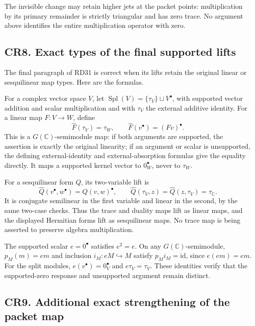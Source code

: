 \documentclass[
]{article}
\begin{document}
The invisible change may retain higher jets at the packet points:
multiplication by its primary remainder is strictly triangular and has
zero trace. No argument above identifies the entire multiplication
operator with zero.

\subsection{CR8. Exact types of the final supported
lifts}\label{cr8.-exact-types-of-the-final-supported-lifts}

The final paragraph of RD31 is correct when its lifts retain the
original linear or sesquilinear map types. Here are the formulas.

For a complex vector space \(V\), let
\(\operatorname{Spl}(V)=\{\tau_V\}\sqcup V^\bullet\), with supported
vector addition and scalar multiplication and with \(\tau_V\) the
external additive identity. For a linear map \(F:V\to W\), define \[
\widehat F(\tau_V)=\tau_W,\qquad
\widehat F(v^\bullet)=(Fv)^\bullet.
\] This is a \(G(\mathbb C)\)-semimodule map: if both arguments are
supported, the assertion is exactly the original linearity; if an
argument or scalar is unsupported, the defining external-identity and
external-absorption formulas give the equality directly. It maps a
supported kernel vector to \(0_W^\bullet\), never to \(\tau_W\).

For a sesquilinear form \(Q\), its two-variable lift is \[
\widehat Q(v^\bullet,w^\bullet)=Q(v,w)^\bullet,
\qquad
\widehat Q(\tau_V,z)=\widehat Q(z,\tau_V)=\tau_{\mathbb C}.
\] It is conjugate semilinear in the first variable and linear in the
second, by the same two-case checks. Thus the trace and duality maps
lift as linear maps, and the displayed Hermitian forms lift as
sesquilinear maps. No trace map is being asserted to preserve algebra
multiplication.

The supported scalar \(e=0^\bullet\) satisfies \(e^2=e\). On any
\(G(\mathbb C)\)-semimodule, \(p_M(m)=em\) and inclusion
\(i_M:eM\hookrightarrow M\) satisfy \(p_Mi_M=\mathrm{id}\), since
\(e(em)=em\). For the split modules, \(e(v^\bullet)=0_V^\bullet\) and
\(e\tau_V=\tau_V\). These identities verify that the supported-zero
response and unsupported argument remain distinct.

\subsection{CR9. Additional exact strengthening of the packet
map}\label{cr9.-additional-exact-strengthening-of-the-packet-map}
\end{document}
